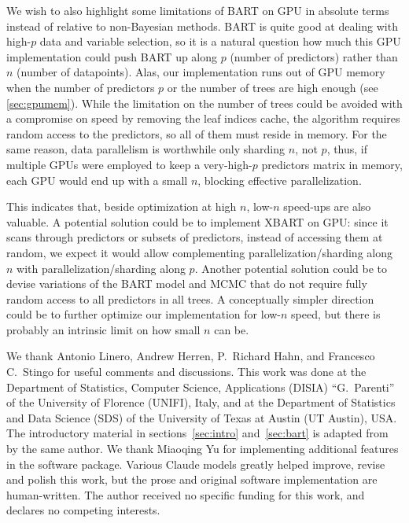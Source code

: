 \documentclass{article}
\newcommand{\redactedcite}[1]{#1}
\begin{document}
We wish to also highlight some limitations of BART on GPU in absolute terms
instead of relative to non-Bayesian methods. BART is quite good at dealing with
high-$p$ data and variable selection, so it is a natural question how much this
GPU implementation could push BART up along $p$ (number of predictors) rather
than $n$ (number of datapoints). Alas, our implementation runs out of GPU
memory when the number of predictors $p$ or the number of trees are high enough
(see \autoref{sec:gpumem}). While the limitation on the number of trees could
be avoided with a compromise on speed by removing the leaf indices cache, the algorithm
requires random access to the predictors, so all of them must reside in memory.
For the same reason, data parallelism is worthwhile only sharding $n$, not $p$,
thus, if multiple GPUs were employed to keep a very-high-$p$ predictors matrix
in memory, each GPU would end up with a small $n$, blocking effective
parallelization.

This indicates that, beside optimization at high $n$, low-$n$ speed-ups are
also valuable. A potential solution could be to implement XBART on GPU: since
it scans through predictors or subsets of predictors, instead of accessing them
at random, we expect it would allow complementing parallelization/sharding
along $n$ with parallelization/sharding along $p$. Another potential solution
could be to devise variations of the BART model and MCMC that do not require
fully random access to all predictors in all trees. A conceptually simpler
direction could be to further optimize our implementation for low-$n$ speed,
but there is probably an intrinsic limit on how small $n$ can be.

\begin{ack}

	We thank Antonio Linero, Andrew Herren, P.\ Richard Hahn, and Francesco
	C.\ Stingo for useful comments and discussions. This work was done at
	the Department of Statistics, Computer Science, Applications (DISIA)
	``G.~Parenti'' of the University of Florence (UNIFI), Italy, and at the
	Department of Statistics and Data Science (SDS) of the University of
	Texas at Austin (UT Austin), USA. The introductory material in
	sections~\ref{sec:intro} and~\ref{sec:bart} is adapted from
	\redactedcite{\citet{petrillo2024f}} by the same author. We thank
	Miaoqing Yu for implementing additional features in the software
	package. Various Claude models greatly helped improve, revise and
	polish this work, but the prose and original software implementation
	are human-written. The author received no specific funding for this
	work, and declares no competing interests.

\end{ack}
\end{document}
